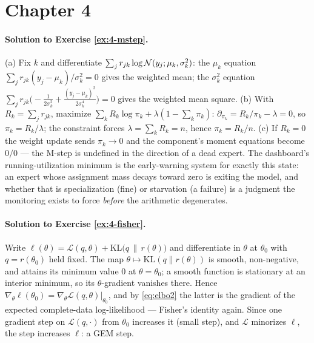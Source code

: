 \section*{Chapter 4}

\paragraph{Solution to Exercise \ref{ex:4-mstep}.}
(a) Fix $k$ and differentiate $\sum_j r_{jk} \log \mathcal{N}(y_j; \mu_k,
\sigma_k^2)$: the $\mu_k$ equation $\sum_j r_{jk}(y_j - \mu_k)/\sigma_k^2
= 0$ gives the weighted mean; the $\sigma_k^2$ equation
$\sum_j r_{jk}\bigl(-\tfrac{1}{2\sigma_k^2} +
\tfrac{(y_j-\mu_k)^2}{2\sigma_k^4}\bigr) = 0$ gives the weighted mean
square. (b) With $R_k = \sum_j r_{jk}$, maximize $\sum_k R_k \log\pi_k +
\lambda(1 - \sum_k \pi_k)$: $\partial_{\pi_k} = R_k/\pi_k - \lambda = 0$,
so $\pi_k = R_k/\lambda$; the constraint forces $\lambda = \sum_k R_k =
n$, hence $\pi_k = R_k/n$. (c) If $R_k = 0$ the weight update sends
$\pi_k \to 0$ and the component's moment equations become $0/0$ --- the
M-step is undefined in the direction of a dead expert. The dashboard's
running-utilization minimum is the early-warning system for exactly this
state: an expert whose assignment mass decays toward zero is exiting the
model, and whether that is specialization (fine) or starvation (a
failure) is a judgment the monitoring exists to force \emph{before} the
arithmetic degenerates.

\paragraph{Solution to Exercise \ref{ex:4-fisher}.}
Write $\ell(\theta) = \mathcal{L}(q, \theta) + \mathrm{KL}\bigl(q \,\|\,
r(\theta)\bigr)$ and differentiate in $\theta$ at $\theta_0$ with $q =
r(\theta_0)$ held fixed. The map $\theta \mapsto \mathrm{KL}(q \|
r(\theta))$ is smooth, non-negative, and attains its minimum value $0$ at
$\theta = \theta_0$; a smooth function is stationary at an interior
minimum, so its $\theta$-gradient vanishes there. Hence $\nabla_\theta
\ell(\theta_0) = \nabla_\theta \mathcal{L}(q, \theta)\big|_{\theta_0}$,
and by \eqref{eq:elbo2} the latter is the gradient of the expected
complete-data log-likelihood --- Fisher's identity again. Since one
gradient step on $\mathcal{L}(q, \cdot)$ from $\theta_0$ increases it
(small step), and $\mathcal{L}$ minorizes $\ell$, the step increases
$\ell$: a GEM step.

